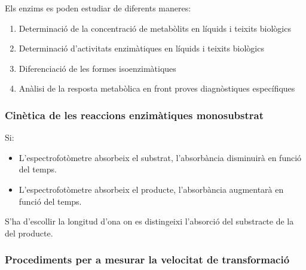 Els enzims es poden estudiar de diferents maneres:
\begin{enumerate}
\item Determinació de la concentració de metabòlits en líquids i
  teixits biològics
\item Determinació d'activitats enzimàtiques en líquids i teixits
  biològics
\item Diferenciació de les formes isoenzimàtiques
\item Anàlisi de la resposta metabòlica en front proves diagnòstiques
  específiques
\end{enumerate}

\subsubsection{Cinètica de les reaccions enzimàtiques monosubstrat}
Si:
\begin{itemize}
\item L'espectrofotòmetre absorbeix el substrat, l'absorbància
  disminuirà en funció del temps.
\item L'espectrofotòmetre absorbeix el producte, l'absorbància
  augmentarà en funció del temps.
\end{itemize}

S'ha d'escollir la longitud d'ona on es distingeixi l'absorció del
substracte de la del producte.

\subsubsection{Procediments per a mesurar la velocitat de
  transformació}

